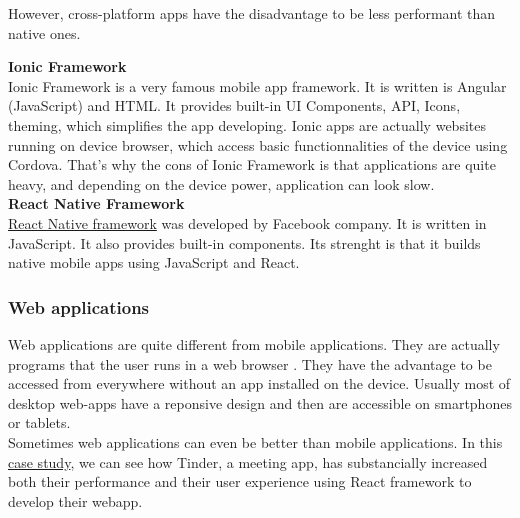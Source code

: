 \documentclass{article}
\begin{document}
                        However, cross-platform apps have the disadvantage to be less performant than native ones.

                        \textbf{Ionic Framework}\\
                        Ionic Framework is a very famous mobile app framework. It is written is Angular (JavaScript) and HTML. It provides
                        built-in UI Components, API, Icons, theming, which simplifies the app developing. Ionic apps are actually websites
                        running on device browser, which access basic functionnalities of the device using Cordova.
                        That's why the cons of Ionic Framework is that applications are quite heavy, and depending on the device power,
                        application can look slow.\\

                        \textbf{React Native Framework}\\
                        \href{https://facebook.github.io/react-native/}{React Native framework} was developed by Facebook company. 
                        It is written in JavaScript. It also provides built-in components. Its strenght is that it builds native
                        mobile apps using JavaScript and React.



                    
                    \subsubsection{Web applications}
                        Web applications are quite different from mobile applications. They are actually programs that the user runs
                        in a web browser \cite{webapp}. They have the advantage to be accessed from everywhere without an app installed
                        on the device. Usually most of desktop web-apps have a reponsive design and then are accessible on smartphones
                        or tablets.\\
                        Sometimes web applications can even be better than mobile applications. In this \href{https://medium.com/@addyosmani/a-tinder-progressive-web-app-performance-case-study-78919d98ece0}{case study},
                        we can see how Tinder, a meeting app, has substancially increased both their performance and their user experience
                        using React framework to develop their webapp.
\end{document}
